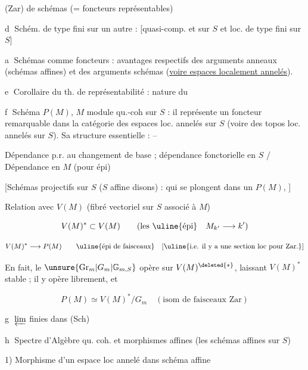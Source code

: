  (Zar) de schémas (= foncteurs représentables)


\textcircled{d} Schém. de type fini sur un autre  : [quasi-comp. et sur $S$ et loc. de type fini sur $S$]

\textcircled{a} Schémas comme foncteurs : avantages respectifs des arguments anneaux (schémas affines) et des arguments schémas (\uline{voire espaces localement annelés}).

\textcircled{e} Corollaire du th. de représentabilité : nature  du 

\textcircled{f} Schéma $P(M)$, $M$ module qu.-coh sur $S$  : il représente un foncteur remarquable  dans la catégorie des espaces loc. annelés sur $S$ (voire des topos loc. annelés sur $S$). Sa structure essentielle : --


Dépendance p.r. au changement de base ; dépendance fonctorielle en $S$ / Dépendance en $M$ (pour épi)

[Schémas projectifs sur $S$ ($S$ affine disons) : qui se plongent  dans un $P(M)$,  ]


Relation avec $V(M)$ (fibré vectoriel sur $S$ associé à $M$)

\[ V(M)^*\subset V(M)\qquad(\text{les \uline{épi}}\quad M_{k'}\longrightarrow k') \]

\[ V(M)^*\longrightarrow P(M)\qquad\text{\uline{épi de faisceaux}}\quad[\text{\uline{i.e. il y a une section loc pour Zar.}}] \]

En fait, le $\unsure{\mathrm{Gr}_m|G_m|\mathbb{G}_{m,S}}$ opère sur $V(M)^{\deleted{*}}$, laissant $V(M)^*$ stable ; il y opère librement, et

\[ P(M)\simeq V(M)^*/G_m\quad(\text{isom de faisceaux Zar}) \]

\textcircled{g} $\varprojlim$ finies dans (Sch)

\textcircled{h} Spectre d'Algèbre qu. coh. et  morphismes affines (les schémas affines sur $S$)

1) Morphisme d'un espace loc annelé dans schéma affine

